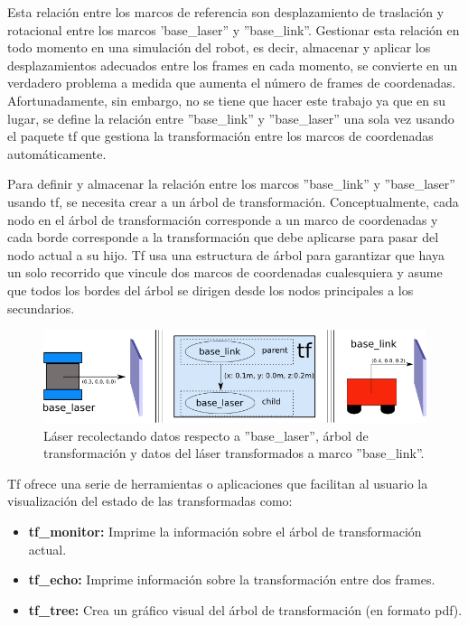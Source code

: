 Esta relación entre los marcos de referencia son desplazamiento de traslación y rotacional entre los marcos 'base\_laser'' y ''base\_link''. Gestionar esta relación en todo momento en una simulación del robot, es decir, almacenar y aplicar los desplazamientos adecuados entre los frames en cada momento, se convierte en un verdadero problema a medida que aumenta el número de frames de coordenadas. Afortunadamente, sin embargo, no se tiene que hacer este trabajo ya que en su lugar, se define la relación entre ''base\_link'' y ''base\_laser'' una sola vez usando el paquete tf que gestiona la transformación entre los marcos de coordenadas automáticamente.

Para definir y almacenar la relación entre los marcos ''base\_link'' y ''base\_laser'' usando tf, se necesita crear a un árbol de transformación. Conceptualmente, cada nodo en el árbol de transformación corresponde a un marco de coordenadas y cada borde corresponde a la transformación que debe aplicarse para pasar del nodo actual a su hijo. Tf usa una estructura de árbol para garantizar que haya un solo recorrido que vincule dos marcos de coordenadas cualesquiera y asume que todos los bordes del árbol se dirigen desde los nodos principales a los secundarios.    


        \begin{figure}[htb]
            \centering
            \includegraphics[width=1.0\linewidth]{Main/Chapter3/Images3/tf_robot.png}
            \caption{Láser recolectando datos respecto a ''base\_laser'', árbol de transformación y datos del láser transformados a marco ''base\_link''. }
            \label{f:Cap3-6_nose1}
        \end{figure}    
        
        
         Tf ofrece una serie de herramientas o aplicaciones que facilitan al usuario la visualización del estado de las transformadas como:
        
        \begin{itemize}
            \item \textbf{tf\_monitor:} Imprime la información sobre el árbol de transformación actual.
            \item \textbf{tf\_echo:} Imprime información sobre la transformación entre dos frames.
            \item \textbf{tf\_tree:} Crea un gráfico visual del árbol de transformación (en formato pdf).
        \end{itemize}
        
